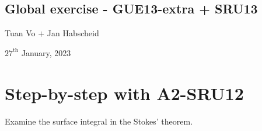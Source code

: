 \documentclass[12pt]{article}
\begin{document}
\begin{center}
	\section*{Global exercise - GUE13-extra + SRU13}
\end{center}
\begin{center}
	Tuan Vo $+$ Jan Habscheid
\end{center}
\begin{center}
	$27^{\text{th}}$ January, 2023
\end{center}
\section{Step-by-step with A2-SRU12}
\begin{mdframed}
	Examine the surface integral in the Stokes' theorem.
\end{mdframed}
\end{document}
